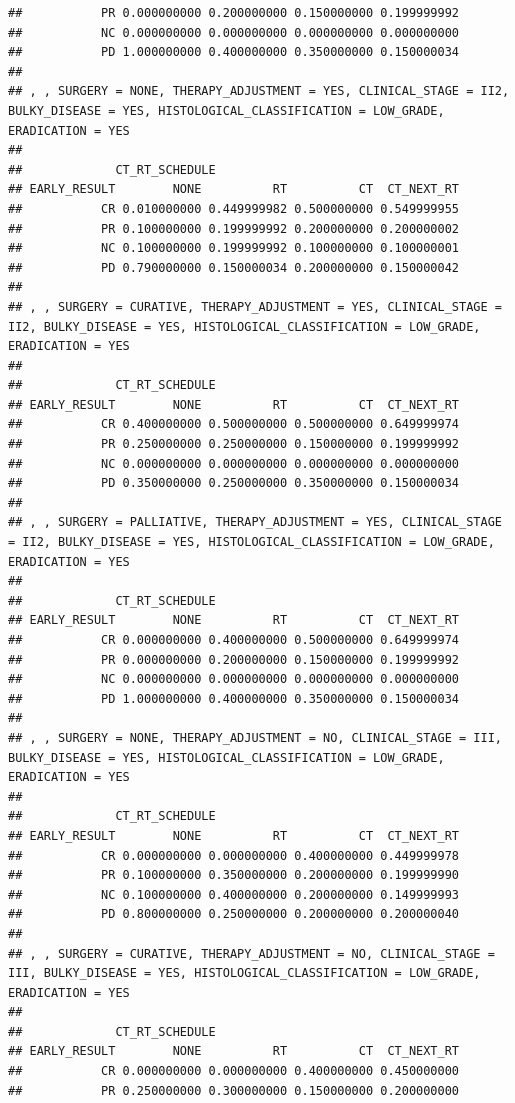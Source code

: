 \documentclass[]{article}
\begin{document}
\begin{verbatim}
##           PR 0.000000000 0.200000000 0.150000000 0.199999992
##           NC 0.000000000 0.000000000 0.000000000 0.000000000
##           PD 1.000000000 0.400000000 0.350000000 0.150000034
## 
## , , SURGERY = NONE, THERAPY_ADJUSTMENT = YES, CLINICAL_STAGE = II2, BULKY_DISEASE = YES, HISTOLOGICAL_CLASSIFICATION = LOW_GRADE, ERADICATION = YES
## 
##             CT_RT_SCHEDULE
## EARLY_RESULT        NONE          RT          CT  CT_NEXT_RT
##           CR 0.010000000 0.449999982 0.500000000 0.549999955
##           PR 0.100000000 0.199999992 0.200000000 0.200000002
##           NC 0.100000000 0.199999992 0.100000000 0.100000001
##           PD 0.790000000 0.150000034 0.200000000 0.150000042
## 
## , , SURGERY = CURATIVE, THERAPY_ADJUSTMENT = YES, CLINICAL_STAGE = II2, BULKY_DISEASE = YES, HISTOLOGICAL_CLASSIFICATION = LOW_GRADE, ERADICATION = YES
## 
##             CT_RT_SCHEDULE
## EARLY_RESULT        NONE          RT          CT  CT_NEXT_RT
##           CR 0.400000000 0.500000000 0.500000000 0.649999974
##           PR 0.250000000 0.250000000 0.150000000 0.199999992
##           NC 0.000000000 0.000000000 0.000000000 0.000000000
##           PD 0.350000000 0.250000000 0.350000000 0.150000034
## 
## , , SURGERY = PALLIATIVE, THERAPY_ADJUSTMENT = YES, CLINICAL_STAGE = II2, BULKY_DISEASE = YES, HISTOLOGICAL_CLASSIFICATION = LOW_GRADE, ERADICATION = YES
## 
##             CT_RT_SCHEDULE
## EARLY_RESULT        NONE          RT          CT  CT_NEXT_RT
##           CR 0.000000000 0.400000000 0.500000000 0.649999974
##           PR 0.000000000 0.200000000 0.150000000 0.199999992
##           NC 0.000000000 0.000000000 0.000000000 0.000000000
##           PD 1.000000000 0.400000000 0.350000000 0.150000034
## 
## , , SURGERY = NONE, THERAPY_ADJUSTMENT = NO, CLINICAL_STAGE = III, BULKY_DISEASE = YES, HISTOLOGICAL_CLASSIFICATION = LOW_GRADE, ERADICATION = YES
## 
##             CT_RT_SCHEDULE
## EARLY_RESULT        NONE          RT          CT  CT_NEXT_RT
##           CR 0.000000000 0.000000000 0.400000000 0.449999978
##           PR 0.100000000 0.350000000 0.200000000 0.199999990
##           NC 0.100000000 0.400000000 0.200000000 0.149999993
##           PD 0.800000000 0.250000000 0.200000000 0.200000040
## 
## , , SURGERY = CURATIVE, THERAPY_ADJUSTMENT = NO, CLINICAL_STAGE = III, BULKY_DISEASE = YES, HISTOLOGICAL_CLASSIFICATION = LOW_GRADE, ERADICATION = YES
## 
##             CT_RT_SCHEDULE
## EARLY_RESULT        NONE          RT          CT  CT_NEXT_RT
##           CR 0.000000000 0.000000000 0.400000000 0.450000000
##           PR 0.250000000 0.300000000 0.150000000 0.200000000

\end{verbatim}
\end{document}
